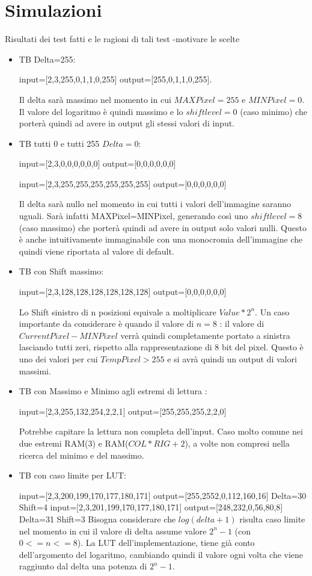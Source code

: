 \documentclass{article}
\begin{document}
\section{Simulazioni}
\label{main-text}
Risultati  dei  test  fatti  e  le ragioni di tali test -motivare le scelte
\begin{itemize}
\item TB Delta=255:

 input=[2,3,255,0,1,1,0,255]
 output=[255,0,1,1,0,255].    
    
   Il delta sarà massimo nel momento in cui \(MAXPixel = 255\) e \(MINPixel = 0\). Il valore del logaritmo è quindi massimo e lo \(shiftlevel=0\) (caso minimo) che porterà quindi ad avere in output gli stessi valori di input.
\item TB tutti 0 e tutti 255 \(Delta=0\):

 input=[2,3,0,0,0,0,0,0] 
 output=[0,0,0,0,0,0]
 
  input=[2,3,255,255,255,255,255,255] 
 output=[0,0,0,0,0,0]
 
 Il delta sarà nullo nel momento in cui tutti i valori dell'immagine saranno uguali. Sarà infatti MAXPixel=MINPixel, generando così uno \(shiftlevel=8\) (caso massimo) che porterà quindi ad avere in output solo valori nulli. Questo è anche intuitivamente immaginabile con una monocromia dell'immagine che quindi viene riportata al valore di default.
 \item TB con Shift massimo:
 
 input=[2,3,128,128,128,128,128,128] 
 output=[0,0,0,0,0,0]

Lo Shift sinistro di n posizioni equivale a moltiplicare \(Value*2^{n}\). Un caso importante da considerare è quando il valore di \(n=8\) : il valore di \(Current Pixel-MINPixel\) verrà quindi completamente portato a sinistra lasciando tutti zeri, rispetto alla rappresentazione di 8 bit del pixel. Questo è uno dei valori per cui \(Temp Pixel>255\) e si avrà quindi un output di valori massimi.
\item TB con Massimo e Minimo agli estremi di lettura : 
 
 input=[2,3,255,132,254,2,2,1] 
 output=[255,255,255,2,2,0]
 
 Potrebbe capitare la lettura non completa dell'input. Caso molto comune nei due estremi RAM(3) e RAM(\(COL*RIG+2\)), a volte non compresi nella ricerca del minimo e del massimo.
 
 \item TB con caso limite per LUT: 
 
  input=[2,3,200,199,170,177,180,171] 
 output=[255,2552,0,112,160,16]
 \newline
 Delta=30 Shift=4
  \newline
 input=[2,3,201,199,170,177,180,171] 
 output=[248,232,0,56,80,8]
  \newline
 Delta=31 Shift=3
  \newline
  Bisogna considerare che \(log (delta +1)\) risulta caso limite nel momento in cui il valore di delta assume valore \(2^{n}-1\) (con \(0<=n<=8\)). La LUT dell'implementazione, tiene già conto dell'argomento del logaritmo, cambiando quindi il valore ogni volta che viene raggiunto dal delta una potenza di \(2^{n}-1\).  
\end{itemize}
\end{document}

